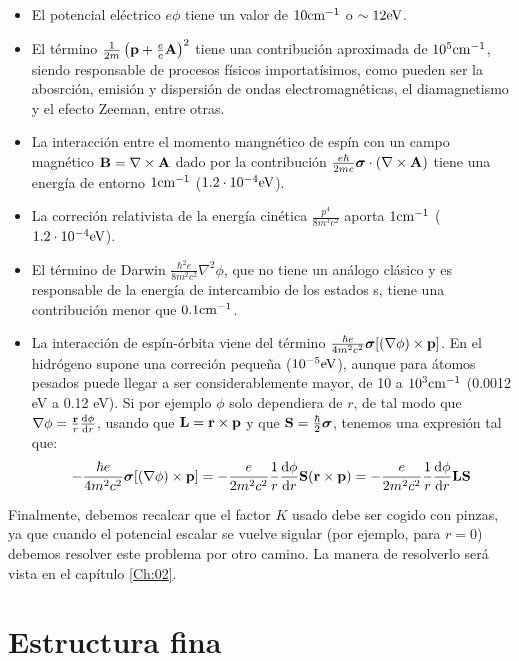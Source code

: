 \begin{itemize}
\item El potencial eléctrico $e\phi$ tiene un valor de $10\text{cm}^{-1}$ o $\sim 12 \text{eV}$.
\item El término $ \frac{1}{2m} \left( \mathbf{p}+\frac{e}{c}\mathbf{A} \right)^2$ tiene una contribución aproximada de $10^5 \text{cm}^{-1}$, siendo responsable de procesos físicos importatísimos, como pueden ser la abosrción, emisión y dispersión de ondas electromagnéticas, el diamagnetismo y el efecto Zeeman, entre otras.
\item La interacción entre el momento mangnético de espín con un campo magnético $\mathbf{B} = \nabla \times \mathbf{A}$ dado por la contribución $\frac{e\hbar}{2mc} \boldsymbol{\sigma} \cdot (\nabla \times \mathbf{A}) $ tiene una energía de entorno $1\text{cm}^{-1}$ ($1.2 \cdot 10^{-4} \text{eV}$). 
\item La correción relativista de la energía cinética $\frac{p^4}{8 m^3 c^2} $ aporta $1\text{cm}^{-1}$ ($1.2 \cdot 10^{-4} \text{eV}$).
\item El término de Darwin $\frac{\hbar^2 e}{8 m^2 c^2} \nabla^2 \phi$, que no tiene un análogo clásico y es responsable de la energía de intercambio de los estados s, tiene una contribución menor que $0.1\text{cm}^{-1}$.
\item La interacción de espín-órbita viene del término $\frac{ \hbar e}{4m^2 c^2} \boldsymbol{\sigma} [(\nabla \phi)\times \mathbf{p}]$. En el hidrógeno supone una correción pequeña ($10^{-5} \text{eV}$), aunque para átomos pesados puede llegar a ser considerablemente mayor, de 10 a $10^3 \text{cm}^{-1}$ (0.0012 eV a 0.12 eV). Si por ejemplo $\phi$ solo dependiera de $r$, de tal modo que $\nabla \phi = \frac{\mathbf{r}}{r} \frac{\mathrm{d} \phi}{\mathrm{d} r}$, usando que $\mathbf{L} = \mathbf{r} \times \mathbf{p}$ y que $\mathbf{S} = \frac{\hbar}{2} \boldsymbol{\sigma}$, tenemos una expresión tal que:
\begin{equation}
    -\frac{ \hbar e}{4m^2 c^2} \boldsymbol{\sigma} [(\nabla \phi)\times \mathbf{p}] = - \frac{e}{2m^2 c^2} \frac{1}{r} \frac{\mathrm{d} \phi}{\mathrm{d} r}  \mathbf{S} (\mathbf{r} \times \mathbf{p}) = - \frac{e}{2m^2 c^2} \frac{1}{r} \frac{\mathrm{d} \phi}{\mathrm{d} r} \mathbf{L} \mathbf{S} \label{Ec:01-03-16}
\end{equation}
\end{itemize}
Finalmente, debemos recalcar que el factor $K$ usado debe ser cogido con pinzas, ya que cuando el potencial escalar se vuelve sigular (por ejemplo, para $r=0$) debemos resolver este problema por otro camino. La manera de resolverlo será vista en el capítulo \ref{Ch:02}.

\section{Estructura fina}



